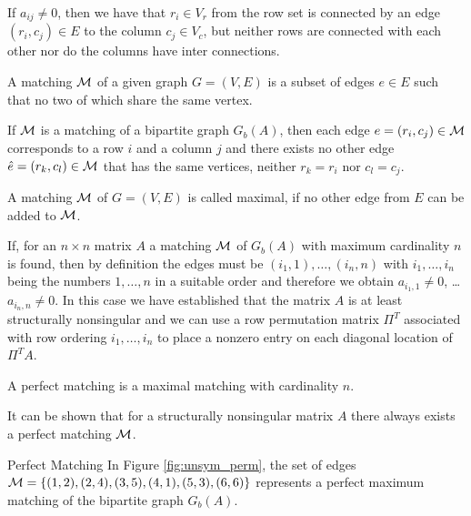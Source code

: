 If $a_{ij}\not=0$, 
then we have that $r_i \in V_r$ from the row set
is connected by an edge $(r_i,c_j) \in E$ to the column $c_j \in V_c$,
but neither rows are connected with each other nor do the columns have
inter connections.
\begin{definition}\label{def:matching}
A matching $\mathcal{M}$
of a given graph $G= (V,E)$ is a subset of edges
$e\in E$ such that no two of which share the same vertex. 
\end{definition}
If $\mathcal{M}$ is a
matching of a bipartite graph $G_b(A)$, then each edge $e=(r_i,c_j) \in \mathcal{M}$ 
corresponds to a row $i$ and a column $j$ and there exists no other edge 
$\hat e=(r_k,c_l) \in \mathcal{M}$ 
that has the same vertices, neither $r_k=r_i$ nor $c_l=c_j$. 
\begin{definition}\label{def:maxmatching}
A matching $\mathcal{M}$ of $G=(V,E)$ is called
maximal, if no other edge from $E$ can be added to $\mathcal{M}$.
\end{definition}
If, for an $n \times n$ matrix $A$ a matching $\mathcal{M}$ of $G_b(A)$ with
maximum cardinality $n$ is found, then by definition the edges 
must be $(i_1,1),\dots,(i_n,n)$ with $i_1,\dots,i_n$ being the 
numbers $1,\dots,n$ in a suitable order and therefore we obtain
$a_{i_1,1}\not=0$, \dots
$a_{i_n,n}\not=0$. In this case 
we have established that the
matrix $A$ is at least structurally nonsingular and we can use a 
row permutation matrix $\Pi^T$ associated with row ordering $i_1,\dots,i_n$ 
to place a nonzero entry on each diagonal location of $\Pi^TA$.
\begin{definition}\label{def:perfect-matching}
A perfect matching is a maximal matching with cardinality $n$.
\end{definition}
It can be shown that for a structurally nonsingular matrix $A$ there always
exists a perfect matching $\mathcal{M}$.
\begin{example}{Perfect Matching}\label{exm:perfect_matching}
In Figure \ref{fig:unsym_perm}, the set of edges $\mathcal{M}= \{(1,2), (2,4),
(3,5), (4,1), (5,3), (6,6) \}$ represents a perfect maximum matching
of the bipartite graph $G_b(A)$.
\end{example}
